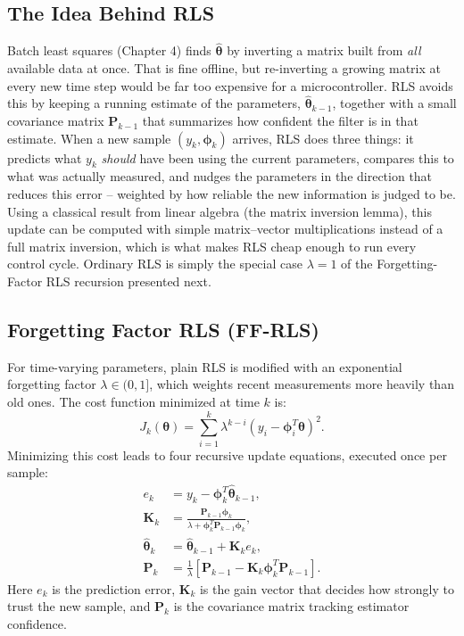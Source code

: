 \subsection{The Idea Behind RLS}
\label{subsec:ch5_rls_idea}

Batch least squares (Chapter 4) finds $\hat{\boldsymbol{\theta}}$ by inverting a matrix built from \emph{all} available data at once. That is fine offline, but re-inverting a growing matrix at every new time step would be far too expensive for a microcontroller. RLS avoids this by keeping a running estimate of the parameters, $\hat{\boldsymbol{\theta}}_{k-1}$, together with a small covariance matrix $\mathbf{P}_{k-1}$ that summarizes how confident the filter is in that estimate. When a new sample $(y_k, \boldsymbol{\phi}_k)$ arrives, RLS does three things: it predicts what $y_k$ \emph{should} have been using the current parameters, compares this to what was actually measured, and nudges the parameters in the direction that reduces this error -- weighted by how reliable the new information is judged to be. Using a classical result from linear algebra (the matrix inversion lemma), this update can be computed with simple matrix--vector multiplications instead of a full matrix inversion, which is what makes RLS cheap enough to run every control cycle. Ordinary RLS is simply the special case $\lambda = 1$ of the Forgetting-Factor RLS recursion presented next.

\subsection{Forgetting Factor RLS (FF-RLS)}
\label{subsec:ch5_ffrls}

For time-varying parameters, plain RLS is modified with an exponential forgetting factor $\lambda \in (0, 1]$, which weights recent measurements more heavily than old ones. The cost function minimized at time $k$ is:
\begin{equation}
J_k(\boldsymbol{\theta}) = \sum_{i=1}^k \lambda^{k-i} \left( y_i - \boldsymbol{\phi}_i^T \boldsymbol{\theta} \right)^2.
\label{eq:ffrls_cost}
\end{equation}
Minimizing this cost leads to four recursive update equations, executed once per sample:
\begin{align}
e_k &= y_k - \boldsymbol{\phi}_k^T \hat{\boldsymbol{\theta}}_{k-1}, \label{eq:ffrls_err} \\
\mathbf{K}_k &= \frac{\mathbf{P}_{k-1} \boldsymbol{\phi}_k}{\lambda + \boldsymbol{\phi}_k^T \mathbf{P}_{k-1} \boldsymbol{\phi}_k}, \label{eq:ffrls_gain} \\
\hat{\boldsymbol{\theta}}_k &= \hat{\boldsymbol{\theta}}_{k-1} + \mathbf{K}_k e_k, \label{eq:ffrls_theta} \\
\mathbf{P}_k &= \frac{1}{\lambda} \left[ \mathbf{P}_{k-1} - \mathbf{K}_k \boldsymbol{\phi}_k^T \mathbf{P}_{k-1} \right]. \label{eq:ffrls_cov}
\end{align}
Here $e_k$ is the prediction error, $\mathbf{K}_k$ is the gain vector that decides how strongly to trust the new sample, and $\mathbf{P}_k$ is the covariance matrix tracking estimator confidence.


